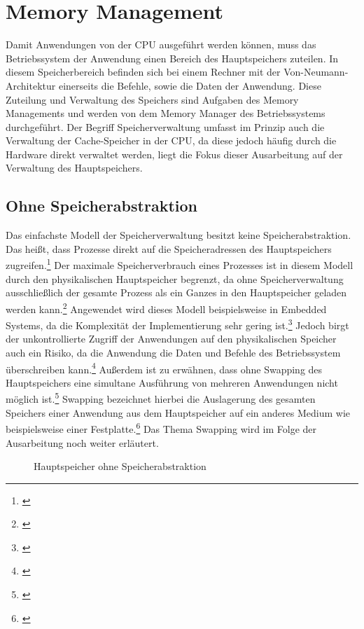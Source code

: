 \section{Memory Management}
\label{sec:MemoryManagement}
Damit Anwendungen von der \ac{CPU} ausgeführt werden können, muss das Betriebssystem der Anwendung einen Bereich des Hauptspeichers zuteilen. In diesem Speicherbereich befinden sich bei einem Rechner mit der Von-Neumann-Architektur einerseits die Befehle, sowie die Daten der Anwendung. Diese Zuteilung und Verwaltung des Speichers sind Aufgaben des Memory Managements und werden von dem Memory Manager des Betriebssystems durchgeführt. Der Begriff Speicherverwaltung umfasst im Prinzip auch die Verwaltung der Cache-Speicher in der \ac{CPU}, da diese jedoch häufig durch die Hardware direkt verwaltet werden, liegt die Fokus dieser Ausarbeitung auf der Verwaltung des Hauptspeichers.

\subsection{Ohne Speicherabstraktion}
\label{subsec:OhneSpeicherabstraktion}
Das einfachste Modell der Speicherverwaltung besitzt keine Speicherabstraktion. Das heißt, dass Prozesse direkt auf die Speicheradressen des Hauptspeichers zugreifen.\footnote{\cite[S.~239]{Tanenbaum.2016}} Der maximale Speicherverbrauch eines Prozesses ist in diesem Modell durch den physikalischen Hauptspeicher begrenzt, da ohne Speicherverwaltung ausschließlich der gesamte Prozess als ein Ganzes in den Hauptspeicher geladen werden kann.\footnote{\cite[S.~239]{Tanenbaum.2016}} Angewendet wird dieses Modell beispielsweise in Embedded Systems, da die Komplexität der Implementierung sehr gering ist.\footnote{\cite[S.~242]{Tanenbaum.2016}} Jedoch birgt der unkontrollierte Zugriff der Anwendungen auf den physikalischen Speicher auch ein Risiko, da die Anwendung die Daten und Befehle des Betriebssystem überschreiben kann.\footnote{\cite[S.~241]{Tanenbaum.2016}} Außerdem ist zu erwähnen, dass ohne Swapping des Hauptspeichers eine simultane  Ausführung von mehreren Anwendungen nicht möglich ist.\footnote{\cite[S.~241]{Tanenbaum.2016}} Swapping bezeichnet hierbei die Auslagerung des gesamten Speichers einer Anwendung aus dem Hauptspeicher auf ein anderes Medium wie beispielsweise einer Festplatte.\footnote{\cite[S.~241]{Tanenbaum.2016}} Das Thema Swapping wird im Folge der Ausarbeitung noch weiter erläutert.

\begin{figure}[htb]
	\centering
	\caption{Hauptspeicher ohne Speicherabstraktion}
\end{figure}


